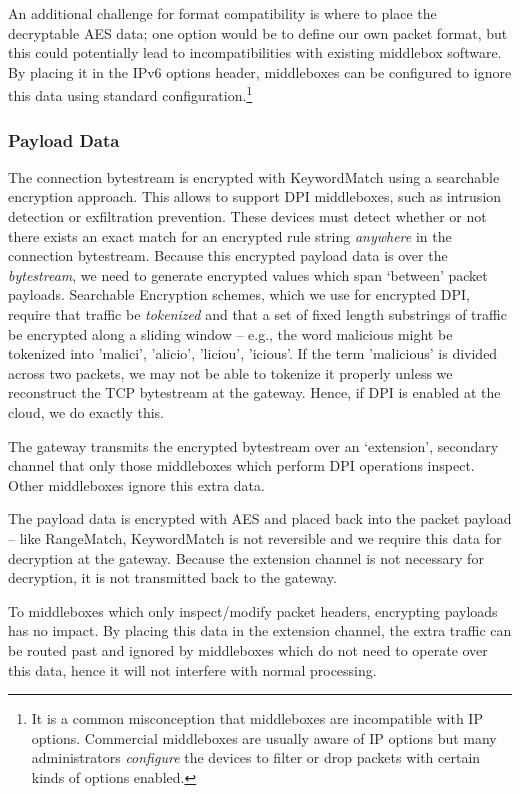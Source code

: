 An additional challenge for format compatibility is where to place the decryptable AES data; one option would be to define our own packet format, but this could potentially lead to incompatibilities with existing middlebox software. By placing it in the IPv6 options header, middleboxes can be configured to ignore this data using standard configuration.\footnote{It is a common misconception that middleboxes are incompatible with IP options. Commercial middleboxes are usually aware of IP options but many administrators {\it configure} the devices to filter or drop packets with certain kinds of options enabled.}


\subsubsection{Payload Data} 
The connection bytestream is encrypted with KeywordMatch using a searchable encryption approach.
This allows \sys to support DPI middleboxes, such as intrusion detection or exfiltration prevention.
These devices must detect whether or not there exists an exact match for an encrypted rule string {\it anywhere} in the connection bytestream.
Because this encrypted payload data is over the {\it bytestream}, we need to generate encrypted values which span `between' packet payloads. 
Searchable Encryption schemes, which we use for encrypted DPI, require that traffic be {\it tokenized} and that a set of fixed length substrings of traffic be encrypted along a sliding window -- e.g., the word malicious might be tokenized into {'malici', 'alicio', 'liciou', 'icious'}.
If the term 'malicious' is divided across two packets, we may not be able to tokenize it properly unless we reconstruct the TCP bytestream at the gateway. Hence, if DPI is enabled at the cloud, we do exactly this.

The gateway transmits the encrypted bytestream over an `extension', secondary channel that only those middleboxes which perform DPI operations inspect. 
Other middleboxes ignore this extra data.



 The payload data is encrypted with AES and placed back into the packet payload -- like RangeMatch, KeywordMatch is not reversible and we require this data for decryption at the gateway.
Because the extension channel is not necessary for decryption, it is not transmitted back to the gateway.

 To middleboxes which only inspect/modify packet headers, encrypting payloads has no impact. 
By placing this data in the extension channel, the extra traffic can be routed past and ignored by middleboxes which do not need to operate over this data, hence it will not interfere with normal processing. 

